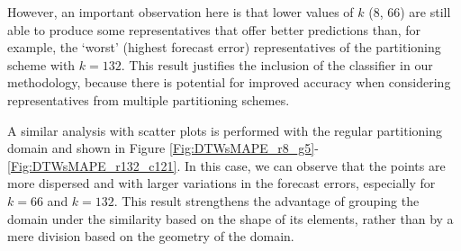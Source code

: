 However, an important observation here is that lower values of $k$ (8, 66) are still able to produce some representatives that offer better predictions than, for example, the `worst' (highest forecast error) representatives of the partitioning scheme with $k=132$. This result justifies the inclusion of the classifier in our methodology, because there is potential for improved accuracy when considering representatives from multiple partitioning schemes.

A similar analysis with scatter plots is performed with the regular partitioning domain and shown in Figure \ref{Fig:DTWsMAPE_r8_g5}-\ref{Fig:DTWsMAPE_r132_c121}. In this case, we can observe that the points are more dispersed and with larger variations in the forecast errors, especially for $k = 66$ and $k = 132$. This result strengthens the advantage of grouping the domain under the similarity based on the shape of its elements, rather than by a mere division based on the geometry of the domain.

